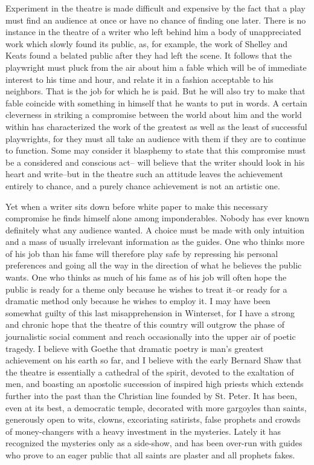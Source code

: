 \documentclass[9pt,twoside]{extarticle}
\begin{document}
Experiment in the theatre is made difficult and expensive by the fact that a play must find an audience at once or have no chance of finding one later. There is no instance in the theatre of a writer who left behind him a body of unappreciated work which slowly found its public, as, for example, the work of Shelley and Keats found a belated public after they had left the scene. It follows that the playwright must pluck from the air about him a fable which will be of immediate interest to his time and hour, and relate it in a fashion acceptable to his neighbors. That is the job for which he is paid. But he will also try to make that fable coincide with something in himself that he wants to put in words. A certain cleverness in striking a compromise between the world about him and the world within has characterized the work of the greatest as well as the least of successful playwrights, for they must all take an audience with them if they are to continue to function. Some may consider it blasphemy to state that this compromise must be a considered and conscious act-- will believe that the writer should look in his heart and write--but in the theatre such an attitude leaves the achievement entirely to chance, and a purely chance achievement is not an artistic one.

Yet when a writer sits down before white paper to make this necessary compromise he finds himself alone among imponderables. Nobody has ever known definitely what any audience wanted. A choice must be made with only intuition and a mass of usually irrelevant information as the guides. One who thinks more of his job than his fame will therefore play safe by repressing his personal preferences and going all the way in the direction of what he believes the public wants. One who thinks as much of his fame as of his job will often hope the public is ready for a theme only because he wishes to treat it--or ready for a dramatic method only because he wishes to employ it. I may have been somewhat guilty of this last misapprehension in Winterset, for I have a strong and chronic hope that the theatre of this country will outgrow the phase of journalistic social comment and reach occasionally into the upper air of poetic tragedy. I believe with Goethe that dramatic poetry is man's greatest achievement on his earth so far, and I believe with the early Bernard Shaw that the theatre is essentially a cathedral of the spirit, devoted to the exaltation of men, and boasting an apostolic succession of inspired high priests which extends further into the past than the Christian line founded by St. Peter. It has been, even at its best, a democratic temple, decorated with more gargoyles than saints, generously open to wits, clowns, excoriating satirists, false prophets and crowds of money-changers with a heavy investment in the mysteries. Lately it has recognized the mysteries only as a side-show, and has been over-run with guides who prove to an eager public that all saints are plaster and all prophets fakes.
\end{document}

